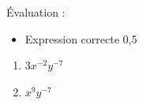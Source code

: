 %
%
    Évaluation :
    \begin{itemize}
        \item Expression correcte \hfill 0,5
    \end{itemize}
    \begin{enumerate}[cols=2]
        \item $3x^{-2}y^{-7}$
        \item $x^9y^{-7}$
    \end{enumerate}
